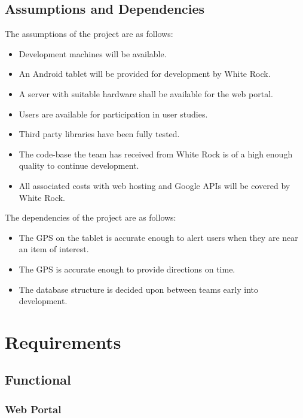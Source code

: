 \documentclass[11pt,a4paper]{article}
\begin{document}
\subsection{Assumptions and Dependencies}
\label{sec:assumptions-dependencies}
The assumptions of the project are as follows:

\begin{itemize}
\item Development machines will be available.
\item An Android tablet will be provided for development by White Rock.
\item A server with suitable hardware shall be available for the web portal.
\item Users are available for participation in user studies.
\item Third party libraries have been fully tested.
\item The code-base the team has received from White Rock is of a high enough quality to continue development.
\item All associated costs with web hosting and Google APIs will be covered by White Rock.
\end{itemize}

The dependencies of the project are as follows:
\begin{itemize}
\item The GPS on the tablet is accurate enough to alert users when they are near an item of interest.
\item The GPS is accurate enough to provide directions on time.
\item The database structure is decided upon between teams early into development.
\end{itemize}

\section{Requirements}
\label{sec:requirements}
\subsection{Functional}
\label{sec:func-reqs}
\subsubsection{Web Portal}
\label{sec:req-reg-login}
\end{document}
